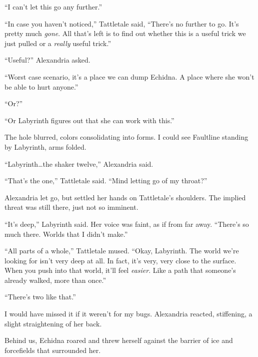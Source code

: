 ``I can't let this go any further.''



``In case you haven't noticed,'' Tattletale said, ``There's no further to go.  It's pretty much \emph{gone}.  All that's left is to find out whether this is a useful trick we just pulled or a \emph{really} useful trick.''



``Useful?''  Alexandria asked.



``Worst case scenario, it's a place we can dump Echidna.  A place where she won't be able to hurt anyone.''



``Or?''



``Or Labyrinth figures out that she can work with this.''



The hole blurred, colors consolidating into forms.  I could see Faultline standing by Labyrinth, arms folded.



``Labyrinth\ldots the shaker twelve,'' Alexandria said.



``That's the one,'' Tattletale said.  ``Mind letting go of my throat?''



Alexandria let go, but settled her hands on Tattletale's shoulders.  The implied threat was still there, just not so imminent.



``It's deep,'' Labyrinth said.  Her voice was faint, as if from far away.  ``There's so much there.  Worlds that I didn't make.''



``All parts of a whole,'' Tattletale mused.  ``Okay, Labyrinth.  The world we're looking for isn't very deep at all.  In fact, it's very, very close to the surface.  When you push into that world, it'll feel \emph{easier}.  Like a path that someone's already walked, more than once.''



``There's two like that.''



I would have missed it if it weren't for my bugs.  Alexandria reacted, stiffening, a slight straightening of her back.



Behind us, Echidna roared and threw herself against the barrier of ice and forcefields that surrounded her.



